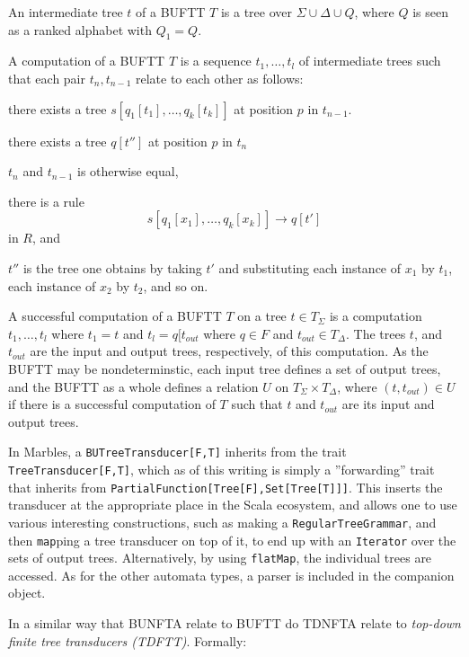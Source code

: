 An intermediate tree $t$ of a BUFTT $T$ is a tree over $\Sigma \cup \Delta
\cup Q$, where $Q$ is seen as a ranked alphabet with $Q_1 = Q$. 

A computation of a BUFTT $T$ is a sequence $t_1,\ldots,t_l$ of intermediate
trees such that each pair $t_n, t_{n-1}$ relate to each other as follows:
\begin{compactitem}
\item there exists a tree $s[q_1[t_1],\ldots,q_k[t_k]]$ at position $p$ in
$t_{n-1}$.
\item there exists a tree $q[t'']$ at position $p$ in $t_n$
\item $t_n$ and $t_{n-1}$ is otherwise equal,
\item there is a rule $$s[q_1[x_1],\ldots,q_k[x_k]] \rightarrow q[t']$$ in
$R$, and
\item $t''$ is the tree one obtains by taking $t'$ and substituting each
instance of $x_1$ by $t_1$, each instance of $x_2$ by $t_2$, and so on.
\end{compactitem}

A successful computation of a BUFTT $T$ on a tree $t \in T_\Sigma$ is a
computation $t_1,\ldots,t_l$ where $t_1 = t$ and $t_l = q[t_{out}$ where $q
\in F$ and $t_{out} \in T_\Delta$. The trees $t$, and $t_{out}$ are the
input and output trees, respectively, of this computation. As the BUFTT may
be nondeterminstic, each input tree defines a set of output trees, and the
BUFTT as a whole defines a relation $U$ on $T_\Sigma \times T_\Delta$, where
$(t, t_{out}) \in U$ if there is a successful computation of $T$ such that
$t$ and $t_{out}$ are its input and output trees.

In Marbles, a \texttt{BUTreeTransducer[F,T]} inherits from the trait
\texttt{TreeTransducer[F,T]}, which as of this writing is simply a
''forwarding'' trait that inherits from
\texttt{PartialFunction[Tree[F],Set[Tree[T]]]}. This inserts the transducer
at the appropriate place in the Scala ecosystem, and allows one to use
various interesting constructions, such as making a
\texttt{RegularTreeGrammar}, and then \texttt{map}ping a tree transducer on
top of it, to end up with an \texttt{Iterator} over the sets of output
trees. Alternatively, by using \texttt{flatMap}, the individual trees are
accessed. As for the other automata types, a parser is included in the
companion object.

In a similar way that BUNFTA relate to BUFTT do TDNFTA relate to
\emph{top-down finite tree transducers (TDFTT)}. Formally:

